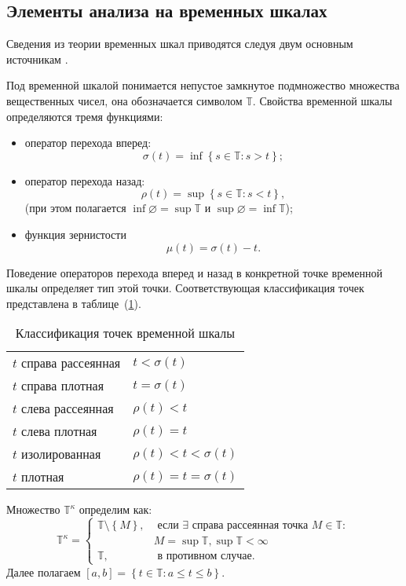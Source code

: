 \subsection{Элементы анализа на временных шкалах}

Сведения из теории временных шкал приводятся следуя двум основным
источникам \cite{Bohner,BohnerAdv}.

\begin{definition}
	Под временной шкалой понимается непустое замкнутое подмножество множества
	вещественных чисел, она обозначается символом $\mathbb{T}$.
	Свойства временной шкалы определяются тремя функциями:
	\begin{itemize}
		\item[1)] оператор перехода вперед:
		\[
		\sigma(t) = \inf\left\{s \in \mathbb{T}: s > t\right\};
		\]
		\item[2)] оператор перехода назад:
		\[
		\rho(t) = \sup\left\{s \in \mathbb{T}: s < t\right\},
		\]
		(при этом полагается $\inf\varnothing = \sup{\mathbb{T}}$ и $\sup\varnothing = \inf{\mathbb{T}}$);
		\item[3)] функция зернистости
		$$\mu(t) = \sigma(t) - t.$$
	\end{itemize}
\end{definition}
Поведение операторов перехода вперед и назад в конкретной точке временной шкалы
определяет тип этой точки. Соответствующая классификация точек представлена в
таблице~(\ref{tab:pointclass}).
\begin{table}[h]
	\begin{center}
		\begin{tabular}{|l|l|}
			\hline
			$t$ справа рассеянная & $t < \sigma(t)$ \\
			$t$ справа плотная    & $t = \sigma(t)$ \\
			$t$ слева рассеянная  & $ \rho(t) < t $ \\
			$t$ слева плотная     & $ \rho(t) = t $ \\
			$t$ изолированная      & $\rho(t) < t < \sigma(t)$ \\
			$t$ плотная           & $\rho(t) = t = \sigma(t)$ \\
			\hline
		\end{tabular}
	\end{center}
	\caption{Классификация точек временной шкалы}		
	
	\label{tab:pointclass}
\end{table}

\begin{definition}
	 Множество $\mathbb{T}^\kappa$ определим как:
	 \[
	 \mathbb{T}^\kappa =
	 \begin{cases}
	 \mathbb{T}\setminus \left\{M\right\}, & \text{ если }
	 \exists \text{ справа рассеянная точка } M \in \mathbb{T}:\\
	 & M = \sup\mathbb{T}, \sup\mathbb{T}<\infty  \\
	 \mathbb{T} , & \text{ в противном случае}.
	 \end{cases}
	 \]
	 Далее полагаем $\left[a, b\right] =
	 \left\{t \in \mathbb{T} : a \leqslant t \leqslant b\right\}$.
\end{definition}


